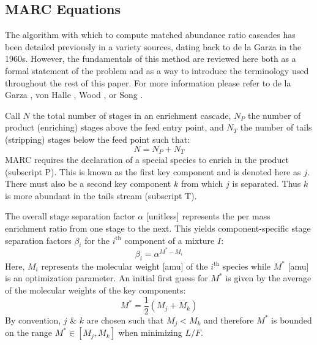 \documentclass[preprint,12pt]{elsarticle}
\newcommand{\ith}[0]{$i^{\mbox{th}}$ }
\begin{document}
\subsection{MARC Equations}
\label{sec:marceq}
The algorithm with which to compute matched abundance ratio cascades has been 
detailed previously in a variety sources, dating back to de la Garza in the
1960s. However, the fundamentals of this method are reviewed here both as a formal
statement of the problem and as a way to introduce the terminology used throughout 
the rest of this paper.  For more information please refer to de la Garza
\cite{DelaGarza1969}, von Halle \cite{VonHalle1987}, Wood \cite{Wood1999}, or 
Song \cite{doi:10.1080/01496391003793884}.

Call $N$ the total number of stages in an enrichment cascade, $N_P$ the number of 
product (enriching) stages above the feed entry point, and $N_T$ the number of tails
(stripping) stages below the feed point such that:
\begin{equation}
N = N_P + N_T
\end{equation}
MARC requires the declaration of a special species to enrich in the 
product (subscript P).  This is known as the first key component and is denoted 
here as $j$.  There must also be a second key component $k$ from which $j$ is 
separated. Thus $k$ is more abundant in the tails stream (subscript T).

The overall stage separation factor $\alpha$ [unitless] represents the per mass 
enrichment ratio from one stage to the next.  This yields component-specific
stage separation factors $\beta_i$ for the \ith component of a mixture $I$:
\begin{equation}
\beta_i = \alpha^{M^* - M_i}
\label{beta_i}
\end{equation}
Here, $M_i$ represents the molecular weight [amu] of the \ith
species while $M^*$ [amu] is an optimization parameter.  An initial first guess for 
$M^*$ is given by the average of the molecular weights of the key components:
\begin{equation}
M^* = \frac{1}{2}\left(M_j + M_k\right)
\label{mstar-guess}
\end{equation}
By convention, $j$ \& $k$ are chosen such that $M_j < M_k$ and 
therefore $M^*$ is bounded on the range $M^*\in[M_j,M_k]$ when minimizing $L/F$.
\end{document}
